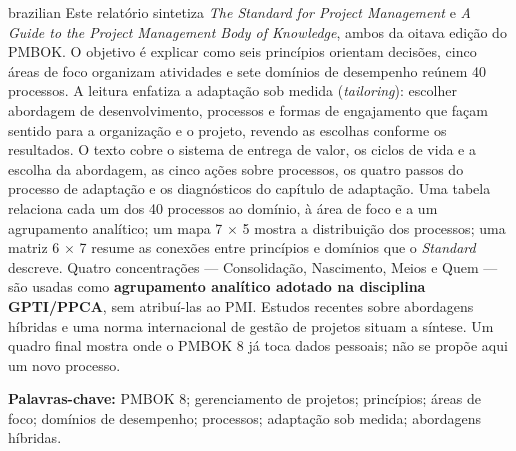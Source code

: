 \documentclass[12pt,a4paper,article,oneside,brazil,english]{abntex2}
\begin{document}
\begin{resumo}[Resumo]
\begin{otherlanguage*}{brazilian}
Este relatório sintetiza \textit{The Standard for Project Management} e \textit{A Guide to the Project Management Body of Knowledge}, ambos da oitava edição do PMBOK. O objetivo é explicar como seis princípios orientam decisões, cinco áreas de foco organizam atividades e sete domínios de desempenho reúnem 40 processos. A leitura enfatiza a adaptação sob medida (\textit{tailoring}): escolher abordagem de desenvolvimento, processos e formas de engajamento que façam sentido para a organização e o projeto, revendo as escolhas conforme os resultados. O texto cobre o sistema de entrega de valor, os ciclos de vida e a escolha da abordagem, as cinco ações sobre processos, os quatro passos do processo de adaptação e os diagnósticos do capítulo de adaptação. Uma tabela relaciona cada um dos 40 processos ao domínio, à área de foco e a um agrupamento analítico; um mapa 7 \ensuremath{\times} 5 mostra a distribuição dos processos; uma matriz 6 \ensuremath{\times} 7 resume as conexões entre princípios e domínios que o \textit{Standard} descreve. Quatro concentrações — Consolidação, Nascimento, Meios e Quem — são usadas como \textbf{agrupamento analítico adotado na disciplina GPTI/PPCA}, sem atribuí-las ao PMI. Estudos recentes sobre abordagens híbridas e uma norma internacional de gestão de projetos situam a síntese. Um quadro final mostra onde o PMBOK 8 já toca dados pessoais; não se propõe aqui um novo processo.

\vspace{\onelineskip}
\noindent\textbf{Palavras-chave:} PMBOK 8; gerenciamento de projetos; princípios; áreas de foco; domínios de desempenho; processos; adaptação sob medida; abordagens híbridas.
\end{otherlanguage*}
\end{resumo}

\clearpage

\tableofcontents*
\clearpage
\listoffigures*
\clearpage
\listoftables*
\clearpage
\end{document}
